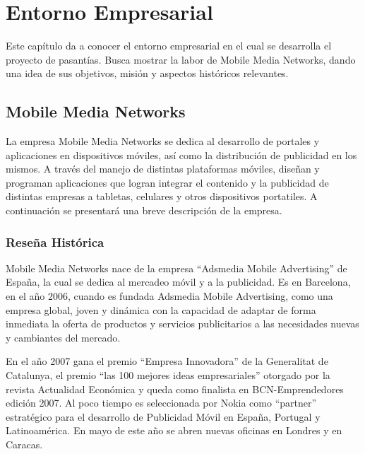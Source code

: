 
\chapter{Entorno Empresarial}

\thispagestyle{empty} 

Este capítulo da a conocer el entorno empresarial en el cual se desarrolla
el proyecto de pasantías. Busca mostrar la labor de Mobile Media Networks,
dando una idea de sus objetivos, misión y aspectos históricos relevantes. 


\section{Mobile Media Networks}

La empresa Mobile Media Networks se dedica al desarrollo de portales
y aplicaciones en dispositivos móviles, así como la distribución de
publicidad en los mismos. A través del manejo de distintas plataformas
móviles, diseñan y programan aplicaciones que logran integrar el contenido
y la publicidad de distintas empresas a tabletas, celulares y otros
dispositivos portatiles. A continuación se presentará una breve descripción
de la empresa.


\subsection{Reseña Histórica}

Mobile Media Networks nace de la empresa \textquotedblleft{}Adsmedia
Mobile Advertising\textquotedblright{} de España, la cual se dedica
al mercadeo móvil y a la publicidad. Es en Barcelona, en el año 2006,
cuando es fundada Adsmedia Mobile Advertising, como una empresa global,
joven y dinámica con la capacidad de adaptar de forma inmediata la
oferta de productos y servicios publicitarios a las necesidades nuevas
y cambiantes del mercado. 

En el año 2007 gana el premio \textquotedblleft{}Empresa Innovadora\textquotedblright{}
de la Generalitat de Catalunya, el premio \textquotedblleft{}las 100
mejores ideas empresariales\textquotedblright{} otorgado por la revista
Actualidad Económica y queda como finalista en BCN-Emprendedores edición
2007. Al poco tiempo es seleccionada por Nokia como \textquotedblleft{}partner\textquotedblright{}
estratégico para el desarrollo de Publicidad Móvil en España, Portugal
y Latinoamérica. En mayo de este año se abren nuevas oficinas en Londres
y en Caracas.\cite{Cap1.Hitos}

